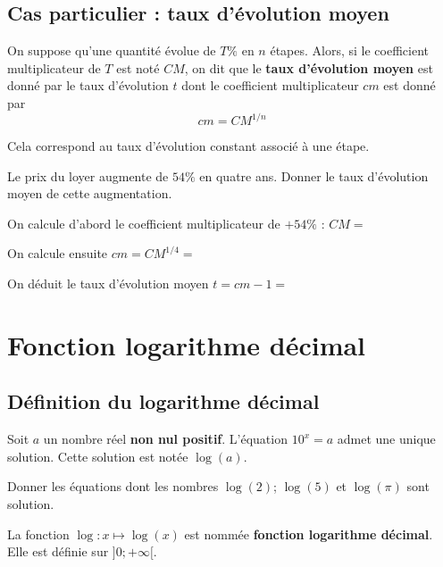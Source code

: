\documentclass{poly}
\begin{document}
\subsection{Cas particulier : taux d'évolution moyen}
\begin{definition}
On suppose qu'une quantité évolue de $T\%$ en $n$ étapes. Alors, si le coefficient multiplicateur de $T$ est noté $CM$, on dit que le \textbf{taux d'évolution moyen} est donné par le taux d'évolution $t$ dont le coefficient multiplicateur $cm$ est donné par
\begin{equation*}
cm = CM^{1/n}
\end{equation*}

Cela correspond au taux d'évolution constant associé à une étape. 
\end{definition}
\begin{center}
\end{center}
\begin{example}
Le prix du loyer augmente de $54\%$ en quatre ans. Donner le taux d'évolution moyen de cette augmentation.

\begin{alphaquestions}
\item On calcule d'abord le coefficient multiplicateur de $+ 54\%$ : $CM = $ 
\item On calcule ensuite $cm = CM^{1/4} = $ 
\item On déduit le taux d'évolution moyen $t = cm - 1 =$ 
\end{alphaquestions}
\end{example}
\newpage
\section{Fonction logarithme décimal}
\subsection{Définition du logarithme décimal}
\begin{definition}
Soit $a$ un nombre réel \textbf{non nul positif}. L'équation $10^x = a$ admet une unique solution. Cette solution est notée $\log(a)$.
\end{definition}
\begin{example}
Donner les équations dont les nombres $\log(2)$; $\log(5)$ et $\log(\pi)$ sont solution.
\end{example}
\begin{definition}
La fonction $\log : x \mapsto \log(x)$ est nommée \textbf{fonction logarithme décimal}. Elle est définie sur $]0;+\infty[$.
\end{definition}
\end{document}
